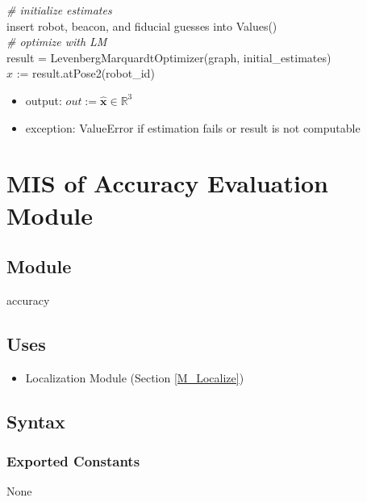 \documentclass[12pt, titlepage]{article}
\begin{document}
\noindent \textit{\# initialize estimates}\\
insert robot, beacon, and fiducial guesses into Values()\\

\noindent \textit{\# optimize with LM}\\
result = LevenbergMarquardtOptimizer(graph, initial\_estimates)\\
$\hat{x}$ := result.atPose2(robot\_id)



\begin{itemize}
\item output: $out:= \mathbf{\hat{x}} \in \mathbb{R}^3$
\item exception: ValueError if estimation fails or result is not computable
\end{itemize}

\newpage

\section{MIS of Accuracy Evaluation Module} \label{M_Accurate}

\subsection{Module}

accuracy

\subsection{Uses}
\begin{itemize}
  \item Localization Module (Section \ref{M_Localize})
\end{itemize}


\subsection{Syntax}

\subsubsection{Exported Constants}
None
\end{document}
